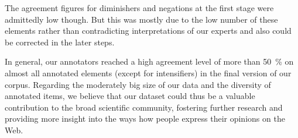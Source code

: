 The agreement figures for diminishers and negations at the first stage
were admittedly low though.  But this was mostly due to the low number
of these elements rather than contradicting interpretations of our
experts and also could be corrected in the later steps.

In general, our annotators reached a high agreement level of more than
50~\% on almost all annotated elements (except for intensifiers) in
the final version of our corpus.  Regarding the moderately big size of
our data and the diversity of annotated items, we believe that our
dataset could thus be a valuable contribution to the broad scientific
community, fostering further research and providing more insight into
the ways how people express their opinions on the Web.
\newpage
